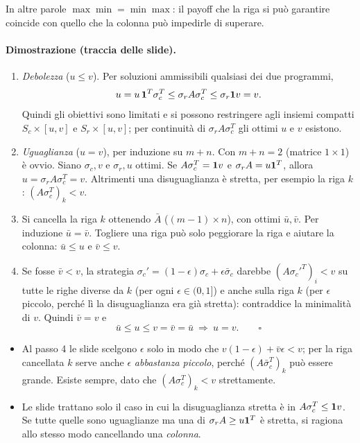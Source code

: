 In altre parole $\max\min = \min\max$: il payoff che la riga si può garantire coincide con
quello che la colonna può impedirle di superare.

\paragraph{Dimostrazione (traccia delle slide).}
\begin{enumerate}
  \item \emph{Debolezza} ($u \le v$). Per soluzioni ammissibili qualsiasi dei due programmi,
        \[
          u = u\,\mathbf{1}^T\sigma_c^T \le \sigma_r A\sigma_c^T \le \sigma_r\mathbf{1} v = v .
        \]
        Quindi gli obiettivi sono limitati e si possono restringere agli insiemi compatti
        $S_c\times[u,v]$ e $S_r\times[u,v]$; per continuità di $\sigma_r A\sigma_c^T$ gli
        ottimi $u$ e $v$ esistono.
  \item \emph{Uguaglianza} ($u = v$), per induzione su $m+n$. Con $m+n = 2$ (matrice
        $1\times1$) è ovvio. Siano $\sigma_c, v$ e $\sigma_r, u$ ottimi. Se
        $A\sigma_c^T = \mathbf{1} v$ e $\sigma_r A = u\mathbf{1}^T$, allora
        $u = \sigma_r A\sigma_c^T = v$. Altrimenti una disuguaglianza è stretta, per esempio
        la riga $k$: $(A\sigma_c^T)_k < v$.
  \item Si cancella la riga $k$ ottenendo $\bar A$ ($(m-1)\times n$), con ottimi
        $\bar u, \bar v$. Per induzione $\bar u = \bar v$. Togliere una riga può solo
        peggiorare la riga e aiutare la colonna: $\bar u \le u$ e $\bar v \le v$.
  \item Se fosse $\bar v < v$, la strategia $\sigma_c' = (1-\epsilon)\sigma_c +
        \epsilon\bar\sigma_c$ darebbe $(A\sigma_c'^T)_i < v$ su tutte le righe diverse da
        $k$ (per ogni $\epsilon \in (0,1]$) e anche sulla riga $k$ (per $\epsilon$ piccolo,
        perché lì la disuguaglianza era già stretta): contraddice la minimalità di $v$.
        Quindi $\bar v = v$ e
        \[
          \bar u \le u \le v = \bar v = \bar u \ \Longrightarrow\ u = v . \qquad\square
        \]
\end{enumerate}

\begin{attenzione}
\begin{itemize}
  \item Al passo 4 le slide scelgono $\epsilon$ solo in modo che
        $v(1-\epsilon) + \bar v\epsilon < v$; per la riga cancellata $k$ serve anche
        $\epsilon$ \emph{abbastanza piccolo}, perché $(A\bar\sigma_c^T)_k$ può essere
        grande. Esiste sempre, dato che $(A\sigma_c^T)_k < v$ strettamente.
  \item Le slide trattano solo il caso in cui la disuguaglianza stretta è in
        $A\sigma_c^T \le \mathbf{1} v$. Se tutte quelle sono uguaglianze ma una di
        $\sigma_r A \ge u\mathbf{1}^T$ è stretta, si ragiona allo stesso modo cancellando una
        \emph{colonna}.
\end{itemize}
\end{attenzione}

